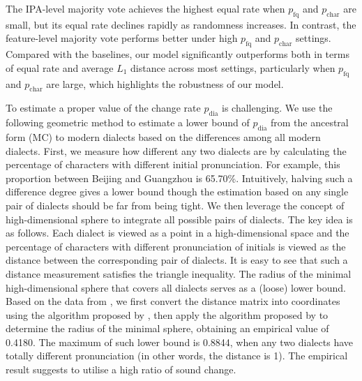 The IPA-level majority vote achieves the highest equal rate when $p_{\text{fq}}$ and $p_{\text{char}}$ are small, but its equal rate declines rapidly as randomness increases. In contrast, the feature-level majority vote performs better under high $p_{\text{fq}}$ and $p_{\text{char}}$ settings. 
Compared with the baselines, our model significantly outperforms both in terms of equal rate and average $L_1$ distance across most settings, particularly when $p_{\text{fq}}$ and $p_{\text{char}}$ are large, which highlights the robustness of our model.

To estimate a proper value of the change rate $p_{\text{dia}}$ is challenging.
We use the following geometric method to estimate a lower bound of $p_{\text{dia}}$ from the ancestral form (MC) to modern dialects based on the differences among all modern dialects. 
First, we measure how different any two dialects are by calculating the percentage of characters with different initial pronunciation. For example, this proportion between Beijing and Guangzhou is 65.70\%. 
Intuitively, halving such a difference degree gives a lower bound though the estimation based on any single pair of dialects should be far from being tight. 
We then leverage the concept of high-dimensional sphere to integrate all possible pairs of dialects.
The key idea is as follows. 
Each dialect is viewed as a point in a high-dimensional space and the percentage of characters with different pronunciation of initials is viewed as the distance between the corresponding pair of dialects. 
It is easy to see that such a distance measurement satisfies the triangle inequality. 
The radius of the minimal high-dimensional sphere that covers all dialects serves as a (loose) lower bound. 
Based on the data from \citeauthor{zihui}, 
we first convert the distance matrix into coordinates using the algorithm proposed by \citet{calculation-of-coordinates}, 
then apply the algorithm proposed by \citet{Smallest-Enclosing-Ball} to determine the radius of the minimal sphere, obtaining an empirical value of 0.4180. 
The maximum of such lower bound is 0.8844, when any two dialects have totally different pronunciation (in other words, the distance is 1).
The empirical result suggests to utilise a high ratio of sound change. 


